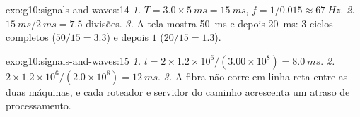 \begin{solution}{exo:g10:signals-and-waves:14}
\emph{1.} $T = 3.0 \times \qty{5}{ms} = \qty{15}{ms}$,
$f = 1/0.015 \approx \qty{67}{Hz}$.
\emph{2.} $\qty{15}{ms}/\qty{2}{ms} = 7.5$ divisões.
\emph{3.} A tela mostra \qty{50}{ms} e depois \qty{20}{ms}: $3$ ciclos
completos ($50/15 = 3.3$) e depois $1$ ($20/15 = 1.3$).
\end{solution}

\begin{solution}{exo:g10:signals-and-waves:15}
\emph{1.} $t = 2 \times 1.2\times10^{6}/(3.00\times10^{8}) =
\qty{8.0}{ms}$.
\emph{2.} $2 \times 1.2\times10^{6}/(2.0\times10^{8}) = \qty{12}{ms}$.
\emph{3.} A fibra não corre em linha reta entre as duas máquinas, e cada
roteador e servidor do caminho acrescenta um atraso de processamento.
\end{solution}


